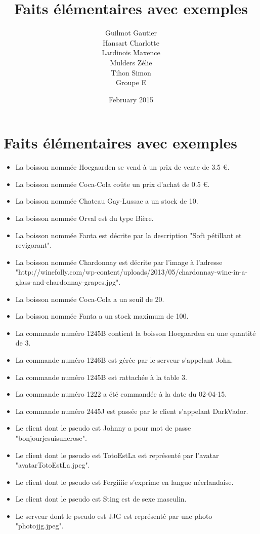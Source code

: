 \documentclass{article}
\title{Faits élémentaires avec exemples}
\author{Guilmot Gautier \\ Hansart Charlotte \\ Lardinois Maxence \\ Mulders Zélie \\ Tihon Simon \\Groupe E  }
\date{February 2015}
\begin{document}
\maketitle

\section{Faits élémentaires avec exemples}
\begin{itemize}\renewcommand{\labelitemi}{$\bullet$}
\item La boisson nommée Hoegaarden se vend à un prix de vente de 3.5 \euro.
\item La boisson nommée Coca-Cola coûte un prix d'achat de 0.5 \euro.
\item La boisson nommée Chateau Gay-Lussac a un stock de 10.
\item La boisson nommée Orval est du type Bière.
\item La boisson nommée Fanta est décrite par la description "Soft pétillant et revigorant".
\item La boisson nommée Chardonnay est décrite par l'image à l'adresse "http://winefolly.com/wp-content/uploads/2013/05/chardonnay-wine-in-a-glass-and-chardonnay-grapes.jpg".
\item La boisson nommée Coca-Cola a un seuil de 20.
\item La boisson nommée Fanta a un stock maximum de 100.
\item La commande numéro 1245B contient la boisson Hoegaarden en une quantité de 3.
\item La commande numéro 1246B est gérée par le serveur s'appelant John. 
\item La commande numéro 1245B est rattachée à la table 3.
\item La commande numéro 1222 a été commandée à la date du 02-04-15.
\item La commande numéro 2445J est passée par le client s'appelant DarkVador.
\item Le client dont le pseudo est Johnny a pour mot de passe "bonjourjesuisunerose".
\item Le client dont le pseudo est TotoEstLa est représenté par l'avatar "avatar\textunderscore TotoEstLa.jpeg".
\item Le client dont le pseudo est Fergiiiie s'exprime en langue néerlandaise.
\item Le client dont le pseudo est Sting est de sexe masculin.
\item Le serveur dont le pseudo est JJG est représenté par une photo "photo\textunderscore jjg.jpeg".

\end{itemize}
\end{document}

